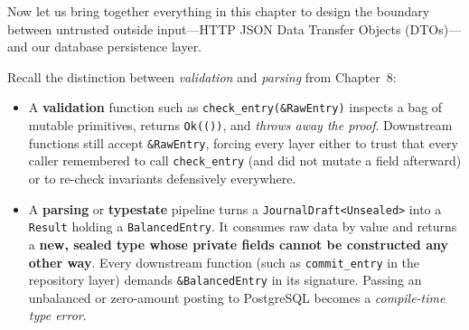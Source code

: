 Now let us bring together everything in this chapter to design the boundary between untrusted outside input---HTTP JSON Data Transfer Objects (DTOs)---and our database persistence layer.

Recall the distinction between \emph{validation} and \emph{parsing} from Chapter~8:
\begin{itemize}
  \item A \textbf{validation} function such as \texttt{check\_entry(\&RawEntry)} inspects a bag of mutable primitives, returns \texttt{Ok(())}, and \emph{throws away the proof}. Downstream functions still accept \texttt{\&RawEntry}, forcing every layer either to trust that every caller remembered to call \texttt{check\_entry} (and did not mutate a field afterward) or to re-check invariants defensively everywhere.
  \item A \textbf{parsing} or \textbf{typestate} pipeline turns a \texttt{JournalDraft<Unsealed>} into a \texttt{Result} holding a \texttt{BalancedEntry}. It consumes raw data by value and returns a \textbf{new, sealed type whose private fields cannot be constructed any other way}. Every downstream function (such as \texttt{commit\_entry} in the repository layer) demands \texttt{\&BalancedEntry} in its signature. Passing an unbalanced or zero-amount posting to PostgreSQL becomes a \emph{compile-time type error}.
\end{itemize}

